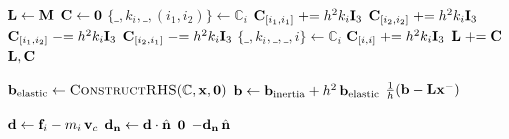 \begin{algorithm}[H]
\caption{Construct constant system matrix (LHS) and elastic matrix for velocity-based PD.}
\label{alg:PD_velocity_LHS}
\begin{algorithmic}[1]
\addtolength{\itemsep}{0.5ex}
    \State $\mathbf{L} \gets \mathbf{M}$
    \State $\mathbf{C} \gets \mathbf{0}$
            \State $\{\_, k_i, \_, (i_1, i_2)\} \gets \mathbb{C}_i$
            \State $\mathbf{C}_{[i_1, i_1]} \mathrel{+}= h^2 k_i\mathbf{I}_{3}$
            \State $\mathbf{C}_{[i_2, i_2]} \mathrel{+}= h^2 k_i\mathbf{I}_{3}$
            \State $\mathbf{C}_{[i_1, i_2]} \mathrel{-}= h^2 k_i\mathbf{I}_{3}$
            \State $\mathbf{C}_{[i_2, i_1]} \mathrel{-}= h^2 k_i\mathbf{I}_{3}$
            \State $\{\_, k_i, \_, \_, i\} \gets \mathbb{C}_i$
            \State $\mathbf{C}_{[i, i]} \mathrel{+}= h^2 k_i\mathbf{I}_{3}$
        \EndIf
    \EndFor
    \State $\mathbf{L} \mathrel{+}= \mathbf{C}$
    \State \Return $\mathbf{L}, \mathbf{C}$
\EndFunction
\end{algorithmic}
\end{algorithm}

\begin{algorithm}[H]
\caption{RHS assembly for velocity-based PD.}
\label{alg:PD_velocity_RHS}
\begin{algorithmic}[1]
\addtolength{\itemsep}{0.5ex}
    \State $\mathbf{b}_{\text{elastic}} \gets \textsc{ConstructRHS}(\mathbb{C}, \mathbf{x}, \mathbf{0})$
    \State $\mathbf{b} \gets \mathbf{b}_{\text{inertia}} + h^2\,\mathbf{b}_{\text{elastic}}$
    \State \Return $\frac{1}{h}(\mathbf{b} - \mathbf{L}\mathbf{x}^-)$
\EndFunction
\end{algorithmic}
\end{algorithm}

\begin{algorithm}[H]
\caption{Frictionless normal contact force update, with a moving obstacle.}
\label{alg:UpdateContactForce_frictionless}
\begin{algorithmic}[1]
\addtolength{\itemsep}{0.5ex}
    \State $\mathbf{d} \gets \mathbf{f}_i - m_i\,\mathbf{v}_c$
    \State $\mathbf{d}_{\mathbf{n}} \gets \mathbf{d} \cdot \hat{\mathbf{n}}$
        \State \Return $\mathbf{0}$
    \Else
        \State \Return $-\mathbf{d}_{\mathbf{n}}\,\hat{\mathbf{n}}$
    \EndIf
\EndFunction
\end{algorithmic}
\end{algorithm}

